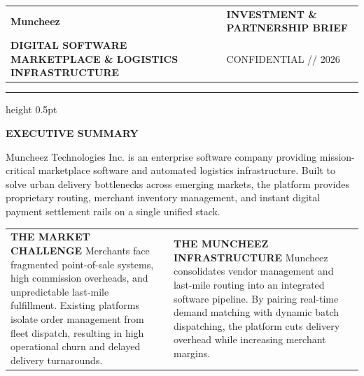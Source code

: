 \documentclass[11pt,a4paper]{article}
\begin{document}
\begin{tabularx}{\textwidth}{@{} X >{\raggedleft\arraybackslash}X @{}}
    {\fontsize{30}{36}\sffamily\bfseries\color{CorporateNavy} Muncheez\color{LinkBlue}{\textbf{.}}} & \textsf{\small\bfseries\color{CorporateNavy} INVESTMENT \& PARTNERSHIP BRIEF} \\
    {\textsf{\scriptsize\bfseries\color{SolidBlack} DIGITAL SOFTWARE MARKETPLACE \& LOGISTICS INFRASTRUCTURE}} & \textsf{\scriptsize\color{SlateGray} CONFIDENTIAL // 2026} \\
\end{tabularx}

\vspace{0.3cm}
\hrule height 0.5pt
\vspace{0.6cm}

{\fontsize{14}{18}\sffamily\bfseries\color{CorporateNavy} EXECUTIVE SUMMARY}

\vspace{0.1cm}
Muncheez Technologies Inc. is an enterprise software company providing mission-critical marketplace software and automated logistics infrastructure. Built to solve urban delivery bottlenecks across emerging markets, the platform provides proprietary routing, merchant inventory management, and instant digital payment settlement rails on a single unified stack.

\vspace{0.6cm}

\begin{tabularx}{\textwidth}{@{} X p{0.5cm} X @{}}
    {\fontsize{12}{15}\sffamily\bfseries\color{CorporateNavy} THE MARKET CHALLENGE} \newline
    \textsf{\small\color{SolidBlack} Merchants face fragmented point-of-sale systems, high commission overheads, and unpredictable last-mile fulfillment. Existing platforms isolate order management from fleet dispatch, resulting in high operational churn and delayed delivery turnarounds.}
    & &
    {\fontsize{12}{15}\sffamily\bfseries\color{LinkBlue} THE MUNCHEEZ INFRASTRUCTURE} \newline
    \textsf{\small\color{SolidBlack} Muncheez consolidates vendor management and last-mile routing into an integrated software pipeline. By pairing real-time demand matching with dynamic batch dispatching, the platform cuts delivery overhead while increasing merchant margins.} \\
\end{tabularx}
\end{document}
